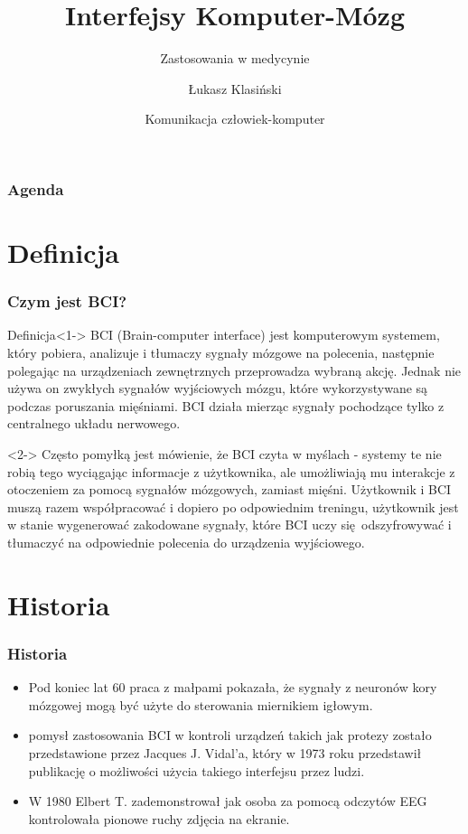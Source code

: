 \documentclass{beamer}
\title[	Interfejsy Komputer-Mózg]
{Interfejsy Komputer-Mózg}
\subtitle{Zastosowania w medycynie }
\author[Łukasz Klasiński] 
{ Łukasz Klasiński}
\institute[UWr]
{
  Wydział informatyki\\
  Uniwersytet Wrocławski
}
\date[18-12-2018]
{ Komunikacja człowiek-komputer }
\begin{document}
 
\frame{\titlepage}
\begin{frame}
    \frametitle{Agenda}
      \tableofcontents
\end{frame}
\section{Definicja}

\begin{frame}
\frametitle{Czym jest BCI?}

    \begin{block}{Definicja}<1->
        BCI (Brain-computer interface) jest komputerowym systemem, który pobiera, analizuje i tłumaczy sygnały mózgowe na polecenia, następnie polegając
        na urządzeniach zewnętrznych przeprowadza wybraną akcję. Jednak nie używa on zwykłych sygnałów wyjściowych mózgu, które
        wykorzystywane są podczas poruszania mięśniami. BCI działa mierząc sygnały pochodzące tylko z centralnego układu
        nerwowego. 
    \end{block}    
    \begin{exampleblock}{}<2->
        Często pomyłką jest mówienie, że BCI czyta w myślach - systemy te nie robią tego wyciągając informacje
        z użytkownika, ale umożliwiają mu interakcje z otoczeniem za pomocą sygnałów mózgowych, zamiast mięśni. Użytkownik 
        i BCI muszą razem współpracować i dopiero po odpowiednim treningu, użytkownik jest w stanie wygenerować zakodowane sygnały, 
        które BCI uczy się odszyfrowywać i tłumaczyć na odpowiednie polecenia do urządzenia wyjściowego.        
    \end{exampleblock}
\end{frame}

\section{Historia}

\begin{frame}
    \frametitle{Historia}

    \begin{itemize}
        \item <1->Pod koniec lat 60 praca z małpami pokazała, że sygnały z  neuronów kory mózgowej mogą być użyte do sterowania miernikiem igłowym.  
        \item <2-> pomysł zastosowania BCI w kontroli urządzeń takich jak protezy zostało przedstawione przez Jacques J. Vidal'a, który w 1973 roku przedstawił publikację o możliwości użycia takiego interfejsu przez ludzi.   
        \item <3-> W 1980 Elbert T. zademonstrował jak osoba za pomocą odczytów EEG kontrolowała pionowe ruchy zdjęcia na ekranie.
    \end{itemize}
\end{frame}
\end{document}
